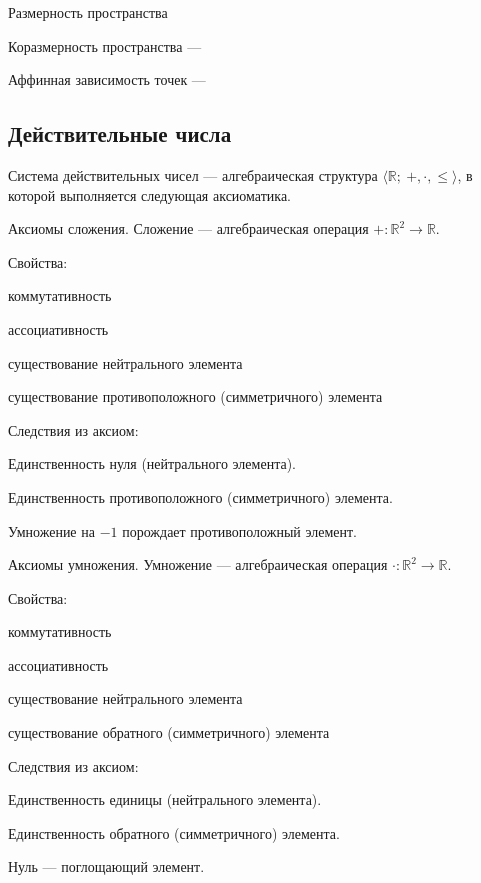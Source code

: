 {\bold Размерность пространства}

{\bold Коразмерность пространства} ---

{\bold Аффинная зависимость точек} ---

\newpage
\subsection{Действительные числа}

{\bold Система действительных чисел} --- алгебраическая структура $\langle\mathbb{R};\ +,\cdot,\leq\rangle$, в которой выполняется следующая {\ital аксиоматика}.
\begin{theorem}
{\bold Аксиомы сложения.} {\ital Сложение} --- алгебраическая операция $+\colon\mathbb{R}^2\to\mathbb{R}$.

Свойства:
\begin{list*}[][\#]
\item коммутативность
\item ассоциативность
\item существование нейтрального элемента
\item существование противоположного {\ital (симметричного)} элемента
\end{list*}
Следствия из аксиом:
\begin{list*}[][\#]
\item Единственность нуля {\ital (нейтрального элемента)}.
\item Единственность противоположного {\ital (симметричного)} элемента.
\item Умножение на $-1$ порождает противоположный элемент.
\end{list*}
\end{theorem}

\begin{theorem}
{\bold Аксиомы умножения.} {\ital Умножение} --- алгебраическая операция $\cdot\colon\mathbb{R}^2\to\mathbb{R}$.

Свойства:
\begin{list*}[][\#]
\item коммутативность
\item ассоциативность
\item существование нейтрального элемента
\item существование обратного {\ital (симметричного)} элемента
\end{list*}
Следствия из аксиом:
\begin{list*}[][\#]
\item Единственность единицы {\ital (нейтрального элемента)}.
\item Единственность обратного {\ital (симметричного)} элемента.
\item Нуль --- поглощающий элемент.
\end{list*}
\end{theorem}

